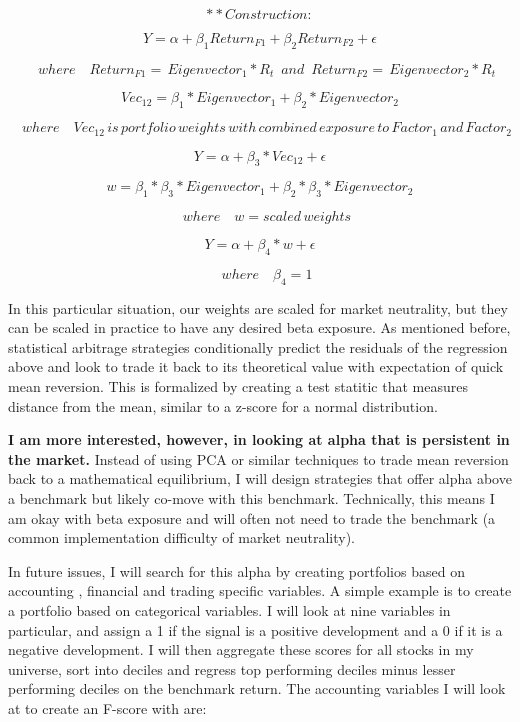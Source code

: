 \documentclass[11pt]{article}
\begin{document}
    \[{**}Construction:\]

\[ Y = \alpha + \beta_{1} Return_{F1} + \beta_{2} Return_{F2} + \epsilon\]

\[ \quad where \quad Return_{F1} = \, Eigenvector_1*R_{t} \,\,\, and \,\,\, Return_{F2} = \, Eigenvector_2*R_{t} \]

\[ Vec_{12} = \beta_{1} * {Eigenvector_1} + \beta_{2} * {Eigenvector_2}\]

\[\quad where \quad Vec_{12} \, is \, portfolio \, weights\, with \, combined \, exposure \, to \, Factor_1 \, and \, Factor_2 \]

\[ Y = \alpha + \beta_{3} * Vec_{12} + \epsilon\]

\[ w = \beta_{1} * \beta_{3} * {Eigenvector_1}  +  \beta_{2} * \beta_{3} * {Eigenvector_2} \]

\[ \quad where \quad w = scaled \, weights \]

\[ Y = \alpha + \beta_{4}*w + \epsilon \]

\[ \quad where \quad \beta_{4} = 1 \]

    In this particular situation, our weights are scaled for market
neutrality, but they can be scaled in practice to have any desired beta
exposure. As mentioned before, statistical arbitrage strategies
conditionally predict the residuals of the regression above and look to
trade it back to its theoretical value with expectation of quick mean
reversion. This is formalized by creating a test statitic that measures
distance from the mean, similar to a z-score for a normal distribution.

\textbf{I am more interested, however, in looking at alpha that is
persistent in the market.} Instead of using PCA or similar techniques to
trade mean reversion back to a mathematical equilibrium, I will design
strategies that offer alpha above a benchmark but likely co-move with
this benchmark. Technically, this means I am okay with beta exposure and
will often not need to trade the benchmark (a common implementation
difficulty of market neutrality).

In future issues, I will search for this alpha by creating portfolios
based on accounting , financial and trading specific variables. A simple
example is to create a portfolio based on categorical variables. I will
look at nine variables in particular, and assign a 1 if the signal is a
positive development and a 0 if it is a negative development. I will
then aggregate these scores for all stocks in my universe, sort into
deciles and regress top performing deciles minus lesser performing
deciles on the benchmark return. The accounting variables I will look at
to create an F-score with are:
\end{document}
